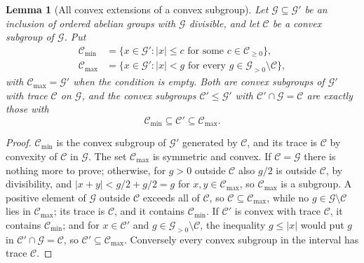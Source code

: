 \documentclass[11pt]{article}
\theoremstyle{plain}
\newtheorem{lemma}[lemma]{Lemma}
\theoremstyle{plain}
\theoremstyle{plain}
\theoremstyle{definition}
\theoremstyle{definition}
\theoremstyle{definition}
\theoremstyle{definition}
\theoremstyle{remark}
\newcommand{\abs}[1]{\lvert#1\rvert}
\begin{document}
\begin{lemma}[All convex extensions of a convex subgroup]
\label{ent:ps:lem:convex-interval}
Let $\mathcal G\subseteq\mathcal G'$ be an inclusion of ordered abelian
groups with $\mathcal G$ divisible, and let $\mathcal C$ be a convex subgroup
of $\mathcal G$. Put
\begin{align}
 \mathcal C_{\min}&=\{x\in\mathcal G':\abs x\le c\text{ for some }
   c\in\mathcal C_{\ge0}\},\label{ent:ps:eq:Cmin}\\
 \mathcal C_{\max}&=\{x\in\mathcal G':\abs x<g\text{ for every }
   g\in\mathcal G_{>0}\setminus\mathcal C\},\label{ent:ps:eq:Cmax}
\end{align}
with $\mathcal C_{\max}=\mathcal G'$ when the condition is empty. Both are
convex subgroups of $\mathcal G'$ with trace $\mathcal C$ on $\mathcal G$, and
the convex subgroups $\mathcal C'\le\mathcal G'$ with
$\mathcal C'\cap\mathcal G=\mathcal C$ are exactly those with
\begin{equation}\label{ent:ps:eq:interval}
 \mathcal C_{\min}\subseteq\mathcal C'\subseteq\mathcal C_{\max}.
\end{equation}
\end{lemma}
\begin{proof}
$\mathcal C_{\min}$ is the convex subgroup of $\mathcal G'$ generated by
$\mathcal C$, and its trace is $\mathcal C$ by convexity of $\mathcal C$ in
$\mathcal G$. The set $\mathcal C_{\max}$ is symmetric and convex. If
$\mathcal C=\mathcal G$ there is nothing more to prove; otherwise, for $g>0$
outside $\mathcal C$ also $g/2$ is outside $\mathcal C$, by divisibility, and
$\abs{x+y}<g/2+g/2=g$ for $x,y\in\mathcal C_{\max}$, so $\mathcal C_{\max}$ is
a subgroup. A positive element of $\mathcal G$ outside $\mathcal C$ exceeds
all of $\mathcal C$, so $\mathcal C\subseteq\mathcal C_{\max}$, while no
$g\in\mathcal G\setminus\mathcal C$ lies in $\mathcal C_{\max}$; its trace is
$\mathcal C$, and it contains $\mathcal C_{\min}$. If $\mathcal C'$ is convex
with trace $\mathcal C$, it contains $\mathcal C_{\min}$; and for
$x\in\mathcal C'$ and $g\in\mathcal G_{>0}\setminus\mathcal C$, the
inequality $g\le\abs x$ would put $g$ in $\mathcal C'\cap\mathcal G=\mathcal
C$, so $\mathcal C'\subseteq\mathcal C_{\max}$. Conversely every convex
subgroup in the interval has trace $\mathcal C$.
\end{proof}
\end{document}
